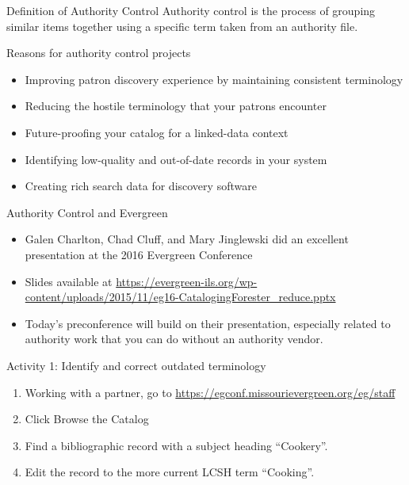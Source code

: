 \documentclass{beamer}
\begin{document}
\begin{frame}{Definition of Authority Control}
Authority control is the process of grouping
similar items together using a specific term taken from
an authority file.

\end{frame}


\begin{frame}{Reasons for authority control projects}
\begin{itemize}
 \item Improving patron discovery experience by maintaining consistent terminology
 \item Reducing the hostile terminology that your patrons encounter
 \item Future-proofing your catalog for a linked-data context
 \item Identifying low-quality and out-of-date records in your system
 \item Creating rich search data for discovery software
\end{itemize}

\end{frame}

\begin{frame}{Authority Control and Evergreen}
\begin{itemize}
 \item Galen Charlton, Chad Cluff, and Mary Jinglewski did an excellent presentation at the 2016 Evergreen Conference
 \item Slides available at \url{https://evergreen-ils.org/wp-content/uploads/2015/11/eg16-CatalogingForester_reduce.pptx}
 \item Today's preconference will build on their presentation, especially related to 
 authority work that you can do without an authority vendor.
\end{itemize}

\end{frame}



\begin{frame}{Activity 1: Identify and correct outdated terminology}
\begin{enumerate}
 \item Working with a partner, go to \url{https://egconf.missourievergreen.org/eg/staff}
 \item Click Browse the Catalog
 \item Find a bibliographic record with a subject heading ``Cookery''.
 \item Edit the record to the more current LCSH term ``Cooking''.
\end{enumerate}

\end{frame}
\end{document}
